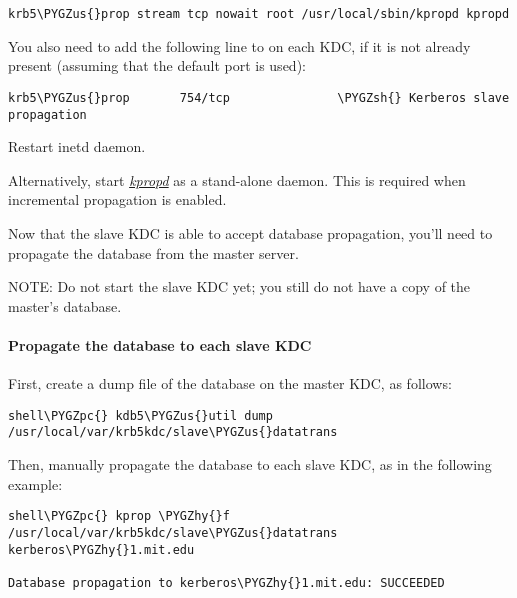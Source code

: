 \documentclass[letterpaper,10pt,english]{sphinxmanual}
\def\PYGZus{\char`\_}
\def\PYGZsh{\char`\#}
\def\PYGZpc{\char`\%}
\def\PYGZhy{\char`\-}
\begin{document}
\begin{Verbatim}[commandchars=\\\{\}]
krb5\PYGZus{}prop stream tcp nowait root /usr/local/sbin/kpropd kpropd
\end{Verbatim}

You also need to add the following line to  on each
KDC, if it is not already present (assuming that the default port is
used):

\begin{Verbatim}[commandchars=\\\{\}]
krb5\PYGZus{}prop       754/tcp               \PYGZsh{} Kerberos slave propagation
\end{Verbatim}

Restart inetd daemon.

Alternatively, start {\hyperref[admin/admin_commands/kpropd:kpropd-8]{\emph{kpropd}}} as a stand-alone daemon.  This is
required when incremental propagation is enabled.

Now that the slave KDC is able to accept database propagation, you’ll
need to propagate the database from the master server.

NOTE: Do not start the slave KDC yet; you still do not have a copy of
the master's database.


\paragraph{Propagate the database to each slave KDC}
\label{admin/install_kdc:kprop-to-slaves}\label{admin/install_kdc:propagate-the-database-to-each-slave-kdc}
First, create a dump file of the database on the master KDC, as
follows:

\begin{Verbatim}[commandchars=\\\{\}]
shell\PYGZpc{} kdb5\PYGZus{}util dump /usr/local/var/krb5kdc/slave\PYGZus{}datatrans
\end{Verbatim}

Then, manually propagate the database to each slave KDC, as in the
following example:

\begin{Verbatim}[commandchars=\\\{\}]
shell\PYGZpc{} kprop \PYGZhy{}f /usr/local/var/krb5kdc/slave\PYGZus{}datatrans kerberos\PYGZhy{}1.mit.edu

Database propagation to kerberos\PYGZhy{}1.mit.edu: SUCCEEDED
\end{Verbatim}
\end{document}
